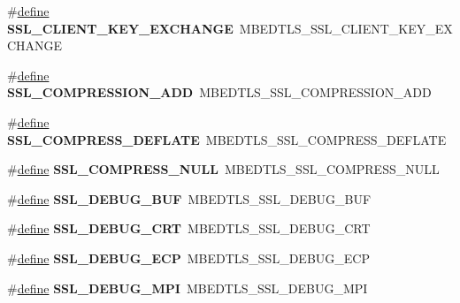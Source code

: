 \begin{DoxyCompactItemize}
\#\hyperlink{structdefine}{define} {\bfseries S\+S\+L\+\_\+\+C\+L\+I\+E\+N\+T\+\_\+\+K\+E\+Y\+\_\+\+E\+X\+C\+H\+A\+N\+GE}~M\+B\+E\+D\+T\+L\+S\+\_\+\+S\+S\+L\+\_\+\+C\+L\+I\+E\+N\+T\+\_\+\+K\+E\+Y\+\_\+\+E\+X\+C\+H\+A\+N\+GE
\item 
\mbox{\label{compat-1_83_8h_a63d3eb06371fa59f67919f105e4affd8}} 
\#\hyperlink{structdefine}{define} {\bfseries S\+S\+L\+\_\+\+C\+O\+M\+P\+R\+E\+S\+S\+I\+O\+N\+\_\+\+A\+DD}~M\+B\+E\+D\+T\+L\+S\+\_\+\+S\+S\+L\+\_\+\+C\+O\+M\+P\+R\+E\+S\+S\+I\+O\+N\+\_\+\+A\+DD
\item 
\mbox{\label{compat-1_83_8h_ae4b89da0e77356598f12b3d48506276d}} 
\#\hyperlink{structdefine}{define} {\bfseries S\+S\+L\+\_\+\+C\+O\+M\+P\+R\+E\+S\+S\+\_\+\+D\+E\+F\+L\+A\+TE}~M\+B\+E\+D\+T\+L\+S\+\_\+\+S\+S\+L\+\_\+\+C\+O\+M\+P\+R\+E\+S\+S\+\_\+\+D\+E\+F\+L\+A\+TE
\item 
\mbox{\label{compat-1_83_8h_ad47aca4f7ebf39713fa96eac86343e7b}} 
\#\hyperlink{structdefine}{define} {\bfseries S\+S\+L\+\_\+\+C\+O\+M\+P\+R\+E\+S\+S\+\_\+\+N\+U\+LL}~M\+B\+E\+D\+T\+L\+S\+\_\+\+S\+S\+L\+\_\+\+C\+O\+M\+P\+R\+E\+S\+S\+\_\+\+N\+U\+LL
\item 
\mbox{\label{compat-1_83_8h_a12c0a73bb030477fea1d39a27302d2fd}} 
\#\hyperlink{structdefine}{define} {\bfseries S\+S\+L\+\_\+\+D\+E\+B\+U\+G\+\_\+\+B\+UF}~M\+B\+E\+D\+T\+L\+S\+\_\+\+S\+S\+L\+\_\+\+D\+E\+B\+U\+G\+\_\+\+B\+UF
\item 
\mbox{\label{compat-1_83_8h_ae8bf0859b2b43edae44dcb86dfb7946c}} 
\#\hyperlink{structdefine}{define} {\bfseries S\+S\+L\+\_\+\+D\+E\+B\+U\+G\+\_\+\+C\+RT}~M\+B\+E\+D\+T\+L\+S\+\_\+\+S\+S\+L\+\_\+\+D\+E\+B\+U\+G\+\_\+\+C\+RT
\item 
\mbox{\label{compat-1_83_8h_a890805629163e2cb9aedce4fb8b97b0f}} 
\#\hyperlink{structdefine}{define} {\bfseries S\+S\+L\+\_\+\+D\+E\+B\+U\+G\+\_\+\+E\+CP}~M\+B\+E\+D\+T\+L\+S\+\_\+\+S\+S\+L\+\_\+\+D\+E\+B\+U\+G\+\_\+\+E\+CP
\item 
\mbox{\label{compat-1_83_8h_a40f09e52dbc1669cb6d9aa438a8641b4}} 
\#\hyperlink{structdefine}{define} {\bfseries S\+S\+L\+\_\+\+D\+E\+B\+U\+G\+\_\+\+M\+PI}~M\+B\+E\+D\+T\+L\+S\+\_\+\+S\+S\+L\+\_\+\+D\+E\+B\+U\+G\+\_\+\+M\+PI

\end{DoxyCompactItemize}
